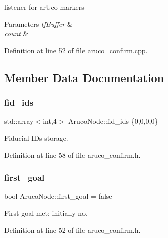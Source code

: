 listener for ar\+Uco markers 


\begin{DoxyParams}{Parameters}
{\em tf\+Buffer} & \\
\hline
{\em count} & \\
\hline
\end{DoxyParams}


Definition at line 52 of file aruco\+\_\+confirm.\+cpp.



\subsection{Member Data Documentation}
\mbox{\label{class_aruco_node_aa64bc8aad47d7569e315f5045ecaa7ac}} 
\subsubsection{\texorpdfstring{fid\+\_\+ids}{fid\_ids}}
{\footnotesize\ttfamily std\+::array$<$int,4$>$ Aruco\+Node\+::fid\+\_\+ids \{0,0,0,0\}}



Fiducial I\+Ds storage. 



Definition at line 58 of file aruco\+\_\+confirm.\+h.

\mbox{\label{class_aruco_node_a323a2a97fc30a4e6daf59d9577485569}} 
\subsubsection{\texorpdfstring{first\+\_\+goal}{first\_goal}}
{\footnotesize\ttfamily bool Aruco\+Node\+::first\+\_\+goal = false}



First goal met; initially no. 



Definition at line 52 of file aruco\+\_\+confirm.\+h.

\mbox{\label{class_aruco_node_a454cdb8d15fa07e7913887a1b2029600}} 
